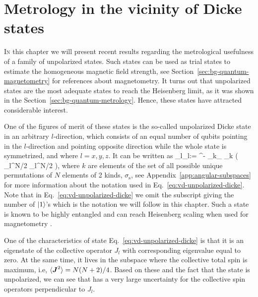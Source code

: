 \section{Metrology in the vicinity of Dicke states}
\label{sec:vd}



\lettrine[lines=2, findent=3pt,nindent=0pt]{I}{n} this chapter we will present recent results regarding the metrological usefulness of a family of unpolarized states.
Such states can be used as trial states to estimate the homogeneous magnetic field strength, see Section~\ref{sec:bg-quantum-magnetometry} for references about magnetometry.
It turns out that unpolarized states are the most adequate states to reach the Heisenberg limit, as it was shown in the Section~\ref{sec:bg-quantum-metrology}.
Hence, these states have attracted considerable interest.

One of the figures of merit of these states is the so-called unpolarized Dicke state \cite{Dicke1954} in an arbitrary $l$-direction, which consists of an equal number of qubits pointing in the $l$-direction and pointing opposite direction while the whole state is symmetrized, and where $l=x,y,z$.
It can be written as
\be
   _l\equiv {}_l:= ^{-}
  \sum_{k\in \sigma_}
  _{k} \left( _l^{\otimes N/2} _l^{\otimes N/2}
  \right),
  \label{eq:vd-unpolarized-dicke}
\ee
where $k$ are elements of the set of all possible unique permutations of $N$ elements of 2 kinds, $\sigma_\text{s}$, see Appendix~\ref{app:angular-subspaces} for more information about the notation used in Eq.~\eqref{eq:vd-unpolarized-dicke}.
Note that in Eq.~\eqref{eq:vd-unpolarized-dicke} we omit the subscript giving the number of $\vert{1}\rangle$'s which is the notation we will follow in this chapter.
Such a state is known to be highly entangled \cite{VR58, VR59} and can reach Heisenberg scaling when used for magnetometry \cite{VR60}.

One of the characteristics of state Eq.~\eqref{eq:vd-unpolarized-dicke} is that it is an eigenstate of the collective operator $J_l$ with corresponding eigenvalue equal to zero.
At the same time, it lives in the subspace where the collective total spin is maximum, i.e, $\langle{\ensuremath{\boldsymbol{J}}^2}\rangle=N(N+2)/4$.
Based on these and the fact that the state is unpolarized, we can see that has a very large uncertainty for the collective spin operators perpendicular to $J_l$.

